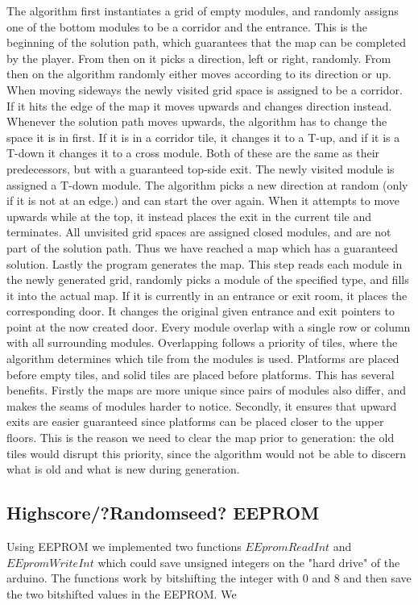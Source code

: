 The algorithm first instantiates a grid of empty modules, and randomly assigns one of the bottom modules to be a corridor and the entrance. This is the beginning of the solution path, which guarantees that the map can be completed by the player. From then on it picks a direction, left or right, randomly. From then on the algorithm randomly either moves according to its direction or up. When moving sideways the newly visited grid space is assigned to be a corridor. If it hits the edge of the map it moves upwards and changes direction instead. Whenever the solution path moves upwards, the algorithm has to change the space it is in first. If it is in a corridor tile, it changes it to a T-up, and if it is a T-down it changes it to a cross module. Both of these are the same as their predecessors, but with a guaranteed top-side exit. The newly visited module is assigned a T-down module. The algorithm picks a new direction at random (only if it is not at an edge.) and can start the over again. When it attempts to move upwards while at the top, it instead places the exit in the current tile and terminates. All unvisited grid spaces are assigned closed modules, and are not part of the solution path. Thus we have reached a map which has a guaranteed solution.
\newline
Lastly the program generates the map. This step reads each module in the newly generated grid, randomly picks a module of the specified type, and fills it into the actual map. If it is currently in an entrance or exit room, it places the corresponding door. It changes the original given entrance and exit pointers to
point at the now created door.
\newline
Every module overlap with a single row or column with all surrounding modules. Overlapping follows a priority of tiles, where the algorithm determines which tile from the modules is used. Platforms are placed before empty tiles, and solid tiles are placed before platforms. This has several benefits. Firstly the maps are more unique since pairs of modules also differ, and makes the seams of modules harder to notice. Secondly, it ensures that upward exits are easier guaranteed since platforms can be placed closer to the upper floors. This is the reason we need to clear the map prior to generation: the old tiles would disrupt this priority, since the algorithm would not be able to discern what is old and what is new during
generation.

\subsection{Highscore/?Randomseed? EEPROM}
Using EEPROM we implemented two functions $EEpromReadInt$ and $EEpromWriteInt$ which could save unsigned integers on the "hard drive" of the arduino. The functions work by bitshifting the integer with 0 and 8 and then save the two bitshifted values in the EEPROM. We 


